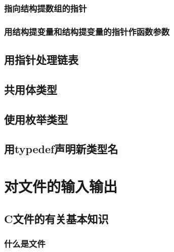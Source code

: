 \subsection{指向结构提数组的指针}
\subsection{用结构提变量和结构提变量的指针作函数参数}
\section{用指针处理链表}
\section{共用体类型}
\section{使用枚举类型}
\section{用typedef声明新类型名}

\chapter{对文件的输入输出}
\section{C文件的有关基本知识}
\subsection{什么是文件}
